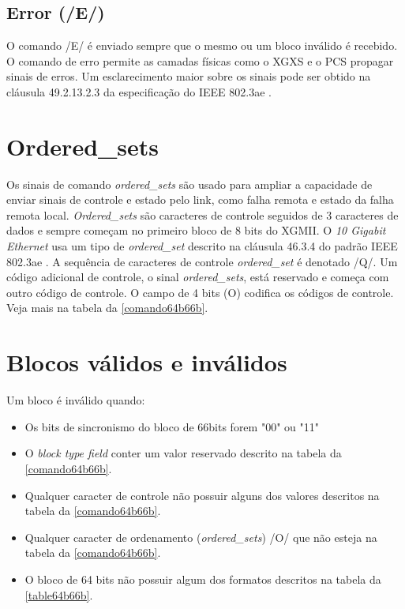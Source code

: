 \subsection{Error (/E/)}

O comando /E/ é enviado sempre que o mesmo ou um bloco inválido é recebido. O comando de erro permite as camadas físicas como o XGXS e o PCS propagar sinais de erros. Um esclarecimento maior sobre os sinais pode ser obtido na cláusula 49.2.13.2.3 da especificação do IEEE 802.3ae \cite{IEEstandard}. 


\section{Ordered\_sets}

Os sinais de comando \textit{ordered\_sets} são usado para ampliar a capacidade de enviar sinais de controle e estado pelo link, como falha remota e estado da falha remota local. \textit{Ordered\_sets} são caracteres de controle seguidos de 3 caracteres de dados e sempre começam no primeiro bloco de 8 bits do XGMII. O \textit{10 Gigabit Ethernet} usa um tipo de \textit{ordered\_set} descrito na cláusula 46.3.4 do padrão IEEE 802.3ae \cite{IEEstandard}. A sequência de caracteres de controle \textit{ordered\_set} é denotado /Q/. Um código adicional de controle, o sinal \textit{ordered\_sets}, está reservado e começa com outro código de controle. O campo de 4 bits (O) codifica os códigos de controle. Veja mais na tabela da \autoref{comando64b66b}. 

\section{Blocos válidos e inválidos} 

Um bloco é inválido quando:

\begin{itemize}
	\item Os bits de sincronismo do bloco de 66bits forem "00" ou "11"
	\item O \textit{block type field} conter um valor reservado descrito na tabela da \autoref{comando64b66b}.
	\item Qualquer caracter de controle não possuir alguns dos valores descritos na tabela da \autoref{comando64b66b}.
	\item Qualquer caracter de ordenamento (\textit{ordered\_sets}) /O/ que não esteja na tabela da \autoref{comando64b66b}.
	\item O bloco de 64 bits não possuir algum dos formatos descritos na tabela da \autoref{table64b66b}.
\end{itemize}

